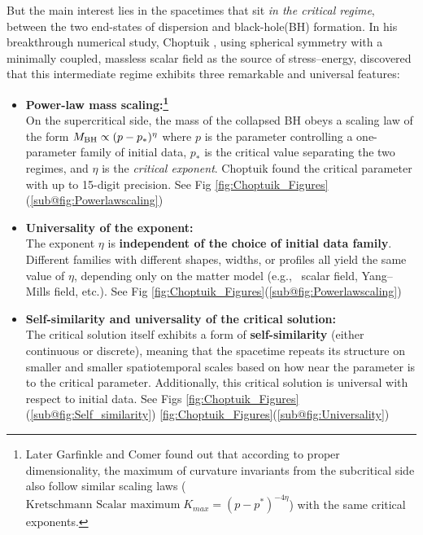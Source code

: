 But the main interest lies in the spacetimes that sit \textit{in the critical regime}, between the two end-states of dispersion and black-hole(BH) formation. In his breakthrough numerical study, Choptuik \cite{choptuik_1993}, using spherical symmetry with a minimally coupled, massless scalar field as the source of stress--energy, discovered that this intermediate regime exhibits three remarkable and universal features:
\begin{itemize}
    \item \textbf{Power-law mass scaling:\footnote{Later Garfinkle and Comer \cite{garfinkle_duncan_1998} found out that according to proper dimensionality, the maximum of curvature invariants from the subcritical side also follow similar scaling laws ($ \text{Kretschmann Scalar maximum} \; K_{max} = (p-p^*)^{-4\eta} $) with the same critical exponents. }
} \\
    On the supercritical side, the mass of the collapsed BH  obeys a scaling law of the form $
        M_{\rm BH} \propto (p - p_*)^\eta $
    where \(p\) is the parameter controlling a one-parameter family of initial data, \(p_*\) is the critical value separating the two regimes, and \(\eta\) is the \emph{critical exponent}. Choptuik found the critical parameter with up to 15-digit precision. See Fig \ref{fig:Choptuik_Figures}(\ref{sub@fig:Powerlawscaling})
    \item \textbf{Universality of the exponent:} \\
    The exponent \(\eta\) is \textbf{independent of the choice of initial data family}. Different families with different shapes, widths, or profiles all yield the same value of \(\eta\), depending only on the matter model (e.g., \ scalar field, Yang--Mills field, etc.). See Fig \ref{fig:Choptuik_Figures}(\ref{sub@fig:Powerlawscaling})

    \item \textbf{Self-similarity and universality of the critical solution:} \\
    The critical solution itself exhibits a form of \textbf{self-similarity} (either continuous or discrete), meaning that the spacetime repeats its structure on smaller and smaller spatiotemporal scales based on how near the parameter is to the critical parameter. Additionally, this critical solution is universal with respect to initial data. See Figs \ref{fig:Choptuik_Figures}(\ref{sub@fig:Self_similarity}) \ref{fig:Choptuik_Figures}(\ref{sub@fig:Universality})
\end{itemize}


